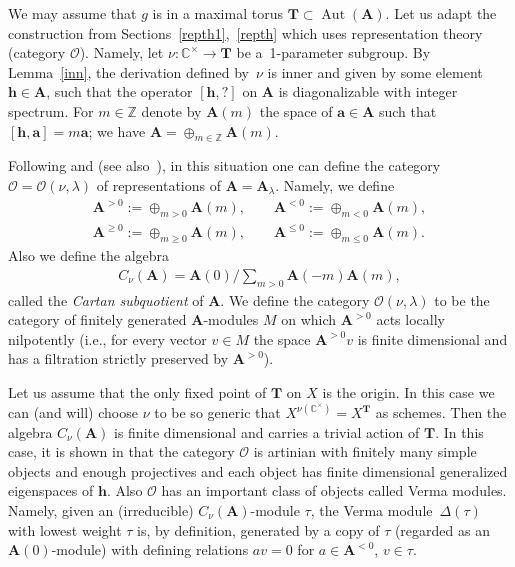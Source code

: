 \documentclass[pdftex]{sigma}
\numberwithin{equation}{section}
\begin{document}
We may assume that $g$ is in a maximal torus ${\mathbf T}\subset \operatorname{Aut}({\mathbf A})$. Let us adapt the construction from Sections~\ref{repth1},~\ref{repth} which uses representation theory (category $\mathcal{O}$). Namely, let $\nu\colon {\mathbb C}^\times\to {\mathbf T}$ be a~1-parameter subgroup.
By Lemma~\ref{inn}, the derivation defined by~$\nu$ is inner and given by some element ${\mathbf{h}}\in {\mathbf A}$, such that the operator $[{\mathbf{h}},?]$ on ${\mathbf A}$ is diagonalizable with integer spectrum. For $m\in {\mathbb Z}$ denote by ${\mathbf A}(m)$ the space of ${\mathbf a}\in {\mathbf A}$ such that $[{\mathbf{h}},{\mathbf a}]=m{\mathbf a}$; we have ${\mathbf A}=\oplus_{m\in {\mathbb Z}}{\mathbf A}(m)$.

Following \cite[Section~4]{L4} and \cite{BLPW} (see also~\cite{G}), in this situation one can define the category $\mathcal{O}=\mathcal{O}(\nu,\lambda)$ of representations of ${\mathbf A}={\mathbf A}_\lambda$. Namely, we define
\begin{gather*}
{\mathbf A}^{>0}:=\oplus_{m>0}{\mathbf A}(m), \qquad {\mathbf A}^{<0}:=\oplus_{m<0}{\mathbf A}(m),\\
{\mathbf A}^{\ge 0}:=\oplus_{m\ge 0}{\mathbf A}(m), \qquad {\mathbf A}^{\le 0}:=\oplus_{m\le 0}{\mathbf A}(m).
\end{gather*}
Also we define the algebra
\begin{gather*}
C_\nu({\mathbf A})={\mathbf A}(0)/\sum_{m>0}{\mathbf A}(-m){\mathbf A}(m),
\end{gather*}
called the {\it Cartan subquotient} of ${\mathbf A}$. We define the category $\mathcal O(\nu,\lambda)$ to be the category of finitely generated ${\mathbf A}$-modules $M$ on which ${\mathbf A}^{>0}$ acts locally nilpotently (i.e., for every vector $v\in M$ the space ${\mathbf A}^{>0}v$ is finite dimensional and has a filtration strictly preserved by ${\mathbf A}^{>0}$).

Let us assume that the only fixed point of ${\mathbf T}$ on $X$ is the origin. In this case we can (and will) choose $\nu$ to be so generic
that $X^{\nu({\mathbb C}^\times)}=X^{{\mathbf T}}$ as schemes. Then the algebra $C_\nu({\mathbf A})$ is finite dimensional and carries a trivial action of ${\mathbf T}$. In this case, it is shown in \cite[Lemma~4.1]{L4} that the category $\mathcal{O}$ is artinian with finitely many simple objects and enough projectives and each object has finite dimensional generalized eigenspaces of ${\mathbf{h}}$. Also $\mathcal{O}$ has an important class of objects called Verma modules. Namely, given an (irreducible) $C_\nu({\mathbf A})$-module $\tau$, the Verma module~$\Delta(\tau)$ with lowest weight $\tau$ is, by definition, generated by a copy of $\tau$ (regarded as an ${\mathbf A}(0)$-module) with defining relations $av=0$ for $a\in {\mathbf A}^{<0}$, $v\in \tau$.
\end{document}
